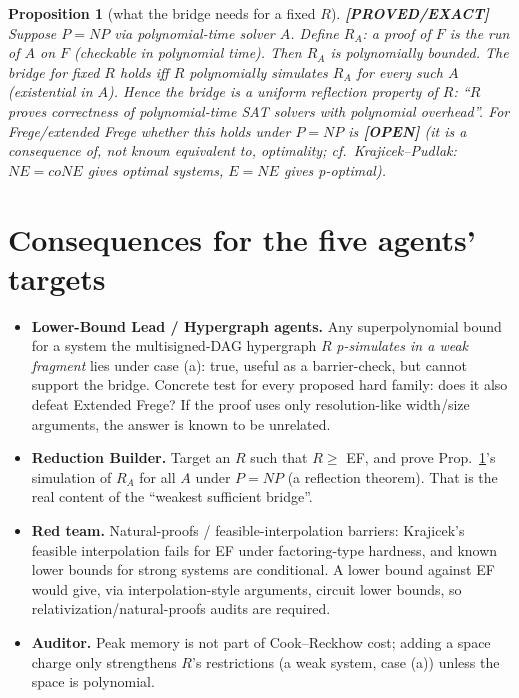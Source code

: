 \documentclass[11pt]{article}
\newtheorem{proposition}[theorem]{Proposition}
\newcommand{\status}[1]{\textbf{[#1]}}
\begin{document}
\begin{proposition}[what the bridge needs for a fixed $R$]\label{p:n}
\status{PROVED/EXACT}
Suppose $P=NP$ via polynomial-time solver $A$. Define $R_A$: a proof of $F$ is the run of $A$ on $F$ (checkable in polynomial time). Then $R_A$ is polynomially bounded. The bridge for fixed $R$ holds iff $R$ polynomially simulates $R_A$ for every such $A$ (existential in $A$). Hence the bridge is a \emph{uniform reflection} property of $R$: ``$R$ proves correctness of polynomial-time SAT solvers with polynomial overhead''. For Frege/extended Frege whether this holds under $P=NP$ is \status{OPEN} (it is a consequence of, not known equivalent to, optimality; cf.\ Krajicek--Pudlak: $NE=coNE$ gives optimal systems, $E=NE$ gives p-optimal).
\end{proposition}

\section{Consequences for the five agents' targets}
\begin{itemize}
\item \textbf{Lower-Bound Lead / Hypergraph agents.} Any superpolynomial bound for a system the multisigned-DAG hypergraph $R$ \emph{p-simulates in a weak fragment} lies under case (a): true, useful as a barrier-check, but cannot support the bridge. Concrete test for every proposed hard family: does it also defeat Extended Frege? If the proof uses only resolution-like width/size arguments, the answer is known to be unrelated.
\item \textbf{Reduction Builder.} Target an $R$ such that $R\ge$ EF, and prove Prop.~\ref{p:n}'s simulation of $R_A$ for all $A$ under $P=NP$ (a reflection theorem). That is the real content of the ``weakest sufficient bridge''.
\item \textbf{Red team.} Natural-proofs / feasible-interpolation barriers: Krajicek's feasible interpolation fails for EF under factoring-type hardness, and known lower bounds for strong systems are conditional. A lower bound against EF would give, via interpolation-style arguments, circuit lower bounds, so relativization/natural-proofs audits are required.
\item \textbf{Auditor.} Peak memory is not part of Cook--Reckhow cost; adding a space charge only strengthens $R$'s restrictions (a weak system, case (a)) unless the space is polynomial.
\end{itemize}
\end{document}
